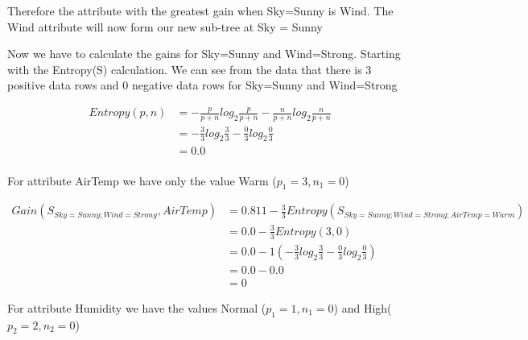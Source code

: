 \documentclass[10pt,a4paper]{article}
\begin{document}
{{{{{{{{{{Therefore the attribute with the greatest gain when Sky=Sunny is Wind. The Wind attribute will now form our new sub-tree at Sky = Sunny 


Now we have to calculate the gains for Sky=Sunny and Wind=Strong. Starting with the Entropy(S) calculation. We can see from the data that there is 3 positive data rows and 0 negative data rows for Sky=Sunny and Wind=Strong 

\begin{equation}
\begin{split}
Entropy(p,n) &=  -\frac{p}{p+n}log_2\frac{p}{p+n} - \frac{n}{p+n}log_2\frac{n}{p+n}  \\
           &= -\frac{3}{3} log_2\frac{3}{3} -\frac{0}{3} log_2\frac{0}{3} \\
           &= 0.0   \\
\end{split}
\end{equation}

For attribute AirTemp we have only the value Warm ($p_1=3,n_1=0$)

\begin{equation}
\begin{split}
Gain(S_{Sky=Sunny;Wind=Strong},AirTemp) &= 0.811 - \frac{3}{3} Entropy(S_{Sky=Sunny;Wind=Strong;AirTemp=Warm} )\\
          &= 0.0 - \frac{3}{3} Entropy(3,0) \\
          &= 0.0 - 1( -\frac{3}{3} log_2\frac{3}{3} -\frac{0}{3} log_2\frac{0}{3} )  \\
          &= 0.0 - 0.0  \\
          &= 0
\end{split}
\end{equation}

For attribute Humidity we have the values Normal ($p_1=1,n_1=0$) and High($p_2=2,n_2=0$)

}}}}}}}}}}
\end{document}
